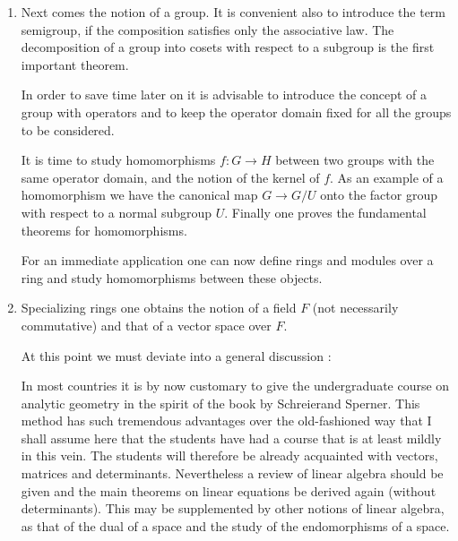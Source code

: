 \begin{enumerate}[(1)]
\item Next comes the notion of a group. It is convenient also to
  introduce the term semigroup, if the composition satisfies only the
  associative law. The decomposition of a group into cosets with
  respect to a subgroup is the first important theorem.

In order to save time later on it is advisable to introduce the
concept of a group with operators and to keep the operator domain
fixed for all the groups to be considered.

It is time to study homomorphisms $f: G \to H$ between two groups
with the same operator domain, and the notion of the kernel of $f$. As
an example of a homomorphism we have the canonical map $G \to G/ U$
onto the factor group with respect to a normal subgroup $U$. Finally
one proves the fundamental theorems for homomorphisms.

For an immediate application one can now define rings and modules over
a ring and study homomorphisms between these objects.

\item Specializing rings one obtains the notion of a field $F$ (not
  necessarily commutative) and that of a vector space over $F$.

At this point we must deviate into a general discussion : 

In most countries it is by now customary to give the undergraduate
course on analytic geometry in the spirit of the book by Schreier\pageoriginale and
Sperner. This method has such tremendous advantages over the
old-fashioned way that I shall assume here that the students have had
a course that is at least mildly in this vein. The students will
therefore be already acquainted with vectors, matrices and
determinants. Nevertheless a review of linear algebra should be given
and the main theorems on linear equations be derived again (without
determinants). This may be supplemented by other notions of linear
algebra, as that of the dual of a space and the study of the
endomorphisms of a space. 


\end{enumerate}
